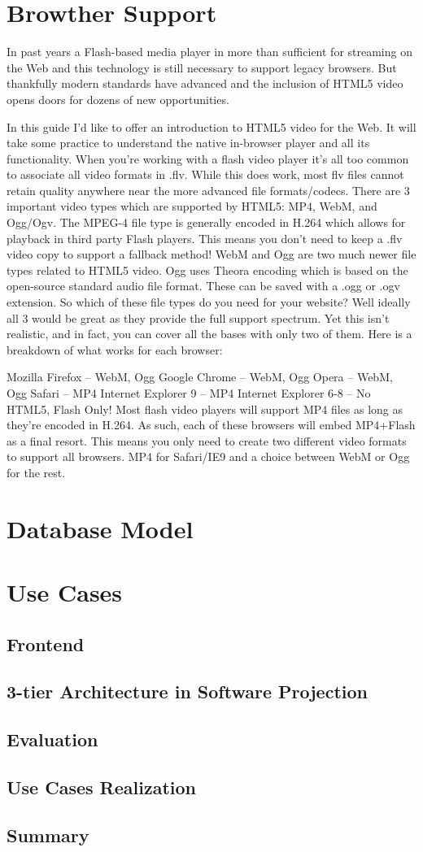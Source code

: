 \section{Browther Support}
In past years a Flash-based media player in more than sufficient for streaming on the Web and this technology is still necessary to support legacy browsers. But thankfully modern standards have advanced and the inclusion of HTML5 video opens doors for dozens of new opportunities.

In this guide I’d like to offer an introduction to HTML5 video for the Web. It will take some practice to understand the native in-browser player and all its functionality. When you’re working with a flash video player it’s all too common to associate all video formats in .flv. While this does work, most flv files cannot retain quality anywhere near the more advanced file formats/codecs. There are 3 important video types which are supported by HTML5: MP4, WebM, and Ogg/Ogv. The MPEG-4 file type is generally encoded in H.264 which allows for playback in third party Flash players. This means you don’t need to keep a .flv video copy to support a fallback method! WebM and Ogg are two much newer file types related to HTML5 video. Ogg uses Theora encoding which is based on the open-source standard audio file format. These can be saved with a .ogg or .ogv extension.
So which of these file types do you need for your website? Well ideally all 3 would be great as they provide the full support spectrum. Yet this isn’t realistic, and in fact, you can cover all the bases with only two of them. Here is a breakdown of what works for each browser:

Mozilla Firefox – WebM, Ogg
Google Chrome – WebM, Ogg
Opera – WebM, Ogg
Safari – MP4
Internet Explorer 9 – MP4
Internet Explorer 6-8 – No HTML5, Flash Only!
Most flash video players will support MP4 files as long as they’re encoded in H.264. As such, each of these browsers will embed MP4+Flash as a final resort. This means you only need to create two different video formats to support all browsers. MP4 for Safari/IE9 and a choice between WebM or Ogg for the rest.
\section{Database Model}
\section{Use Cases}
  \subsection{Frontend}
  \subsection{3-tier Architecture in Software Projection}
  \subsection{Evaluation}
  \subsection{Use Cases Realization}
\subsection{Summary}
